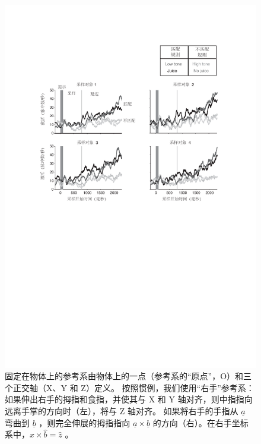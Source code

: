 \begin{figure}[!htb]
	\centering
	\includegraphics[width=0.55\linewidth]{chap7/7_9}
	\caption{固定在物体上的参考系由物体上的一点（参考系的“原点”，O）和三个正交轴（X、Y 和 Z）定义。
		按照惯例，我们使用“右手”参考系：
		如果伸出右手的拇指和食指，并使其与 X 和 Y 轴对齐，则中指指向远离手掌的方向时（左），将与 Z 轴对齐。
		如果将右手的手指从 $\underline{a}$ 弯曲到 $\underline{b}$ ，则完全伸展的拇指指向 $\underline{a} \times \underline{b}$ 的方向（右）。在右手坐标系中，$\hat{x} \times \hat{b} = \hat{z}$ 。 \label{fig:7_9}}
\end{figure}



